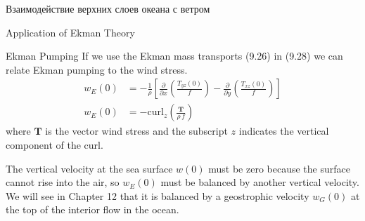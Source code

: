 \begin{chapter}{Взаимодействие верхних слоев океана с ветром}
\begin{section}{Application of Ekman Theory}
\begin{paragraph}{Ekman Pumping}
If we use the Ekman mass transports
(9.26) in (9.28) we can relate Ekman pumping to
the wind stress.
\begin{subequations}
\begin{align}
w_E(0)
&=-\frac{1}{\rho}\left[ \frac{\partial}{\partial{x}} \left( \frac{T_{yz}(0)}{f}
\right) -\frac{\partial}{\partial{y}} \left( \frac{T_{xz}(0)}{f} \right) \right]
\\ w_E(0) &=-\text{curl}_z  \left( \frac{\mathbf{T}}{\rho\,f} \right)
\end{align}
\end{subequations}
where $\mathbf{T}$ is the vector wind stress and the subscript $z$
indicates the vertical component of the curl.
%

The vertical velocity at the sea surface $w(0)$ must be zero because
the surface cannot rise into the air, so $w_E(0)$ must be balanced by
another vertical velocity. We will see in Chapter 12 that it is
balanced by a geostrophic
velocity $w_G(0)$ at the top of the interior flow in the ocean.
%


\end{paragraph}
\end{section}
\end{chapter}
